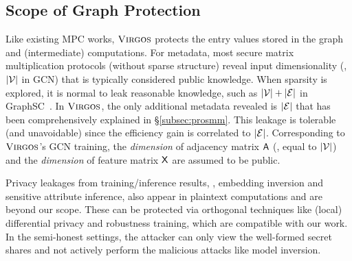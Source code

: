 \subsection{Scope of Graph Protection}
\iffalse
In the GCN, training data contains graph structure (\ie, represented by adjacency matrix) and features/labels.
In our two-party setting, the party $\pp_0$ holds a private graph, while another party $\pp_1$ owns the features/labels.
The party of graph holder can derive permutation operations corresponding to its private graph, \ie, privately owning the private permutation.
Considering semi-honest security, no party learns the GCN model in clear during the whole process.
\fi

Like existing MPC works, $\cgnn$ protects the entry values stored in the graph and (intermediate) computations.
For metadata, most secure matrix multiplication protocols (without sparse structure) reveal input
dimensionality (\eg, $|\mathcal{V}|$ in GCN) that is typically considered public knowledge.
When sparsity is explored, it is normal to leak reasonable knowledge, such as $|\mathcal{V}|+|\mathcal{E}|$ in GraphSC~\cite{sp/NayakWIWTS15}.
In $\cgnn$, the only additional metadata revealed is $|\mathcal{E}|$ that has been comprehensively explained in \S\ref{subsec:prosmm}.
This leakage is tolerable (and unavoidable) since the efficiency gain is correlated to $|\mathcal{E}|$.
Corresponding to $\cgnn$'s GCN training, the \textit{dimension} of adjacency matrix $\mathsf{A}$ (\ie, equal to $|\mathcal{V}|$) and the \textit{dimension} of feature matrix $\mathsf{X}$ are assumed to be public. 

\iffalse
Without sparse structures, the matrix-vector multiplication protocol leaks the dimension of the input matrix, \ie, the number of nodes.
In the GCN training, the node features/labels and the coordinates of non-zero values are two types of sensitive information related to node privacy and edge privacy.
When we exploit sparsity, leaking information about sparsity is tolerable since the efficiency gain is correlated to non-sparsity extraction.
Our construction in Section~\ref{subsec:prosmm} leaks the number of source and target nodes and the number of nodes.
However, we mitigate this leakage by padding the dummy source/target nodes in Section~\ref{sec::smm::degree}, minimizing the only leakage to be the total number of nodes and edges in the graph.
Notably, $\cgnn$'s protocols do not leak information about per-row/column degree or per-node/edge privacy.
\fi

Privacy leakages from training/inference results, \eg, embedding inversion and sensitive attribute inference, also appear in plaintext computations and are beyond our scope.
These can be protected via orthogonal techniques like (local) differential privacy and robustness training, which are compatible with our work.
In the semi-honest settings, the attacker can only view the well-formed secret shares and not actively perform the malicious attacks like model inversion.